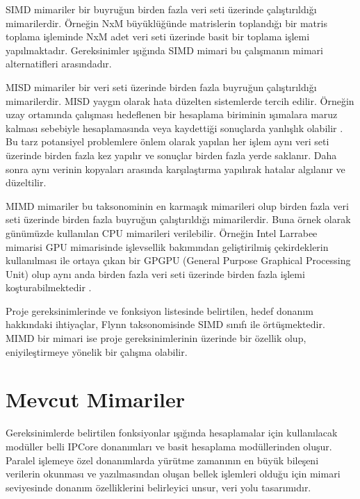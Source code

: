 SIMD mimariler bir buyruğun birden fazla veri seti üzerinde çalıştırıldığı mimarilerdir. Örneğin NxM büyüklüğünde matrislerin toplandığı bir matris toplama işleminde NxM adet veri seti üzerinde basit bir toplama işlemi yapılmaktadır. Gereksinimler ışığında SIMD mimari bu çalışmanın mimari alternatifleri arasındadır. \par

MISD mimariler bir veri seti üzerinde birden fazla buyruğun çalıştırıldığı mimarilerdir. MISD yaygın olarak hata düzelten sistemlerde tercih edilir. Örneğin uzay ortamında çalışması hedeflenen bir hesaplama biriminin ışımalara maruz kalması sebebiyle hesaplamasında veya kaydettiği sonuçlarda yanlışlık olabilir \cite{shivakumar2002modeling}. Bu tarz potansiyel problemlere önlem olarak yapılan her işlem aynı veri seti üzerinde birden fazla kez yapılır ve sonuçlar birden fazla yerde saklanır. Daha sonra aynı verinin kopyaları arasında karşılaştırma yapılırak hatalar algılanır ve düzeltilir. \par

MIMD mimariler bu taksonominin en karmaşık mimarileri olup birden fazla veri seti üzerinde birden fazla buyruğun çalıştırıldığı mimarilerdir. Buna örnek olarak günümüzde kullanılan CPU mimarileri verilebilir. Örneğin Intel Larrabee mimarisi GPU mimarisinde işlevsellik bakımından geliştirilmiş çekirdeklerin kullanılması ile ortaya çıkan bir GPGPU (General Purpose Graphical Processing Unit) olup aynı anda birden fazla veri seti üzerinde birden fazla işlemi koşturabilmektedir \cite{seiler2008larrabee}.\par

Proje gereksinimlerinde ve fonksiyon listesinde belirtilen, hedef donanım hakkındaki ihtiyaçlar, Flynn taksonomisinde SIMD sınıfı ile örtüşmektedir. MIMD bir mimari ise proje gereksinimlerinin üzerinde bir özellik olup, eniyileştirmeye yönelik bir çalışma olabilir.

\section{Mevcut Mimariler}
Gereksinimlerde belirtilen fonksiyonlar ışığında hesaplamalar için kullanılacak modüller belli IPCore donanımları ve basit hesaplama modüllerinden oluşur. Paralel işlemeye özel donanımlarda yürütme zamanının en büyük bileşeni verilerin okunması ve yazılmasından oluşan bellek işlemleri olduğu için mimari seviyesinde donanım özelliklerini belirleyici unsur, veri yolu tasarımıdır.\par

